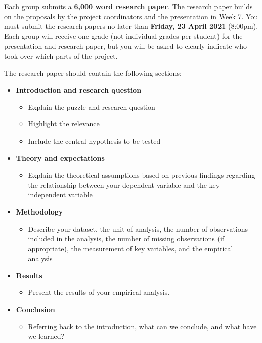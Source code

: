 \documentclass[abstract=on,parskip=full,headings=standardclasses,fontsize=11pt,paper=a4]{scrartcl}
\begin{document}
 Each group submits a \textbf{6,000 word research paper}. The research paper builds on the proposals by the project coordinators and the presentation in Week 7. You  must submit the research papers no later than \textbf{Friday, 23 April 2021} (8:00pm). Each group will receive one grade (not individual grades per student) for the presentation and research paper, but you will be asked to clearly indicate who took over which parts of the project. 
 
 

The research paper should contain the following sections:
\begin{itemize}
\item \textbf{Introduction and research question} 
\begin{itemize}
\item Explain the puzzle and research question
\item Highlight the relevance
\item Include the central hypothesis to be tested
\end{itemize}
\item \textbf{Theory and expectations} 
\begin{itemize}
\item Explain the theoretical assumptions based on previous findings regarding the  relationship between your dependent variable and the key independent variable
\end{itemize}
\item \textbf{Methodology} 
\begin{itemize}
\item Describe your dataset, the unit of analysis, the number of observations included in the analysis, the number of missing observations (if appropriate), the measurement of key variables, and the empirical analysis
\end{itemize}
\item \textbf{Results}
\begin{itemize}
\item Present the results of your empirical analysis.
\end{itemize}
\item \textbf{Conclusion}
\begin{itemize}
\item Referring back to the introduction, what can we conclude, and what have we learned?
\end{itemize}
\end{itemize}
\end{document}
